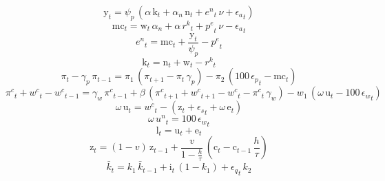 \begin{dmath}
{{\mathrm{y}}}_{t}={{\psi_{p}}}\, \left({{\alpha}}\, {{\mathrm{k}}}_{t}+{{\alpha_{n}}}\, {{\mathrm{n}}}_{t}+{{e^{n}}}_{t}\, {{\nu}}+{{\epsilon_{a}}}_{t}\right)
\end{dmath}
\begin{dmath}
{{\mathrm{mc}}}_{t}={{\mathrm{w}}}_{t}\, {{\alpha_{n}}}+{{\alpha}}\, {{r^{k}}}_{t}+{{p^{e}}}_{t}\, {{\nu}}-{{\epsilon_{a}}}_{t}
\end{dmath}
\begin{dmath}
{{e^{n}}}_{t}={{\mathrm{mc}}}_{t}+\frac{{{\mathrm{y}}}_{t}}{{{\psi_{p}}}}-{{p^{e}}}_{t}
\end{dmath}
\begin{dmath}
{{\mathrm{k}}}_{t}={{\mathrm{n}}}_{t}+{{\mathrm{w}}}_{t}-{{r^{k}}}_{t}
\end{dmath}
\begin{dmath}
{{\pi}}_{t}-{{\gamma_{p}}}\, {{\pi}}_{t-1}={{\pi_{1}}}\, \left({{\pi}}_{t+1}-{{\pi}}_{t}\, {{\gamma_{p}}}\right)-{{\pi_{2}}}\, \left(100\, {{\epsilon_{p}}}_{t}-{{\mathrm{mc}}}_{t}\right)
\end{dmath}
\begin{dmath}
{{\pi^{c}}}_{t}+{{w^{c}}}_{t}-{{w^{c}}}_{t-1}={{\gamma_{w}}}\, {{\pi^{c}}}_{t-1}+{{\beta}}\, \left({{\pi^{c}}}_{t+1}+{{w^{c}}}_{t+1}-{{w^{c}}}_{t}-{{\pi^{c}}}_{t}\, {{\gamma_{w}}}\right)-{{w_{1}}}\, \left({{\omega}}\, {{\mathrm{u}}}_{t}-100\, {{\epsilon_{w}}}_{t}\right)
\end{dmath}
\begin{dmath}
{{\omega}}\, {{\mathrm{u}}}_{t}={{w^{c}}}_{t}-\left({{\mathrm{z}}}_{t}+{{\epsilon_{s}}}_{t}+{{\omega}}\, {{\mathrm{e}}}_{t}\right)
\end{dmath}
\begin{dmath}
{{\omega}}\, {{u^{n}}}_{t}=100\, {{\epsilon_{w}}}_{t}
\end{dmath}
\begin{dmath}
{{\mathrm{l}}}_{t}={{\mathrm{u}}}_{t}+{{\mathrm{e}}}_{t}
\end{dmath}
\begin{dmath}
{{\mathrm{z}}}_{t}=\left(1-{{v}}\right)\, {{\mathrm{z}}}_{t-1}+\frac{{{v}}}{1-\frac{{{h}}}{{{\tau}}}}\, \left({{\mathrm{c}}}_{t}-{{\mathrm{c}}}_{t-1}\, \frac{{{h}}}{{{\tau}}}\right)
\end{dmath}
\begin{dmath}
{{\bar{k}}}_{t}={{k_{1}}}\, {{\bar{k}}}_{t-1}+{{\mathrm{i}}}_{t}\, \left(1-{{k_{1}}}\right)+{{\epsilon_{q}}}_{t}\, {{k_{2}}}
\end{dmath}
